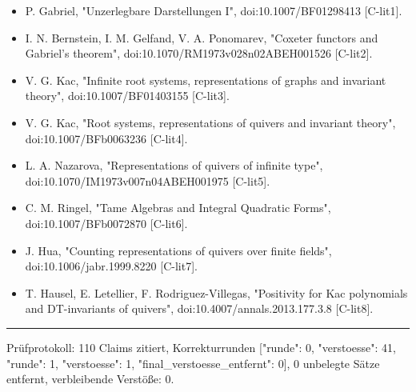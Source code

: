 \documentclass[10pt,twocolumn]{article}
\begin{document}
\begin{itemize}
\item P. Gabriel, "Unzerlegbare Darstellungen I", doi:10.1007/BF01298413 {\scriptsize[C-lit1]}.
\item I. N. Bernstein, I. M. Gelfand, V. A. Ponomarev, "Coxeter functors and Gabriel's theorem", doi:10.1070/RM1973v028n02ABEH001526 {\scriptsize[C-lit2]}.
\item V. G. Kac, "Infinite root systems, representations of graphs and invariant theory", doi:10.1007/BF01403155 {\scriptsize[C-lit3]}.
\item V. G. Kac, "Root systems, representations of quivers and invariant theory", doi:10.1007/BFb0063236 {\scriptsize[C-lit4]}.
\item L. A. Nazarova, "Representations of quivers of infinite type", doi:10.1070/IM1973v007n04ABEH001975 {\scriptsize[C-lit5]}.
\item C. M. Ringel, "Tame Algebras and Integral Quadratic Forms", doi:10.1007/BFb0072870 {\scriptsize[C-lit6]}.
\item J. Hua, "Counting representations of quivers over finite fields", doi:10.1006/jabr.1999.8220 {\scriptsize[C-lit7]}.
\item T. Hausel, E. Letellier, F. Rodriguez-Villegas, "Positivity for Kac polynomials and DT-invariants of quivers", doi:10.4007/annals.2013.177.3.8 {\scriptsize[C-lit8]}.
\end{itemize}

\par\noindent\rule{\columnwidth}{0.4pt}\par
Prüfprotokoll: 110 Claims zitiert, Korrekturrunden [{"runde": 0, "verstoesse": 41}, {"runde": 1, "verstoesse": 1}, {"final\_verstoesse\_entfernt": 0}], 0 unbelegte Sätze entfernt, verbleibende Verstöße: 0.
\end{document}
